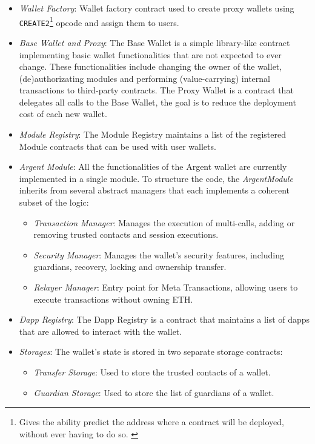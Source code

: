 \begin{itemize}
    \item \textit{Wallet Factory}: Wallet factory contract used to create proxy wallets using \texttt{CREATE2}\footnote{Gives the ability predict the address where a contract will be deployed, without ever having to do so. \cite{opcode-create2}} opcode and assign them to users.
    \item \textit{Base Wallet and Proxy}: The Base Wallet is a simple library-like contract implementing basic wallet functionalities that are not expected to ever change. These functionalities include changing the owner of the wallet, (de)authorizating modules and performing (value-carrying) internal transactions to third-party contracts. The Proxy Wallet is a contract that delegates all calls to the Base Wallet, the goal is to reduce the deployment cost of each new wallet.
    \item \textit{Module Registry}: The Module Registry maintains a list of the registered Module contracts that can be used with user wallets.
    \item \textit{Argent Module}: All the functionalities of the Argent wallet are currently implemented in a single module. To structure the code, the \textit{ArgentModule} inherits from several abstract managers that each implements a coherent subset of the logic:
        \begin{itemize}
            \item \textit{Transaction Manager}: Manages the execution of multi-calls, adding or removing trusted contacts and session executions.
            \item \textit{Security Manager}: Manages the wallet's security features, including guardians, recovery, locking and ownership transfer.
            \item \textit{Relayer Manager}: Entry point for Meta Transactions, allowing users to execute transactions without owning ETH.
        \end{itemize}
    \item \textit{Dapp Registry}: The Dapp Registry is a contract that maintains a list of dapps that are allowed to interact with the wallet.
    \item \textit{Storages}: The wallet's state is stored in two separate storage contracts:
    \begin{itemize}
        \item \textit{Transfer Storage}: Used to store the trusted contacts of a wallet.
        \item \textit{Guardian Storage}: Used to store the list of guardians of a wallet.
    \end{itemize}
\end{itemize}